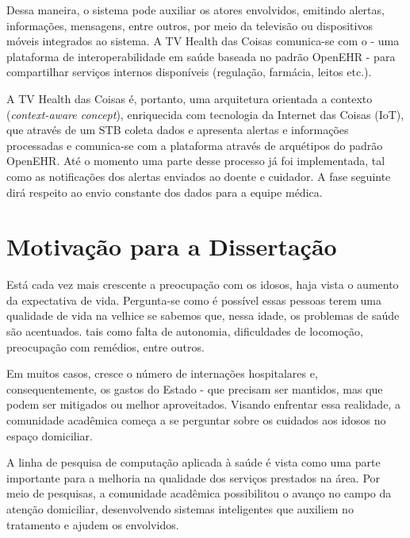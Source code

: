 Dessa maneira, o sistema pode auxiliar os atores envolvidos, emitindo alertas,
informações, mensagens, entre outros, por meio da televisão ou dispositivos móveis
integrados ao sistema. A TV Health das Coisas comunica-se com o \nextsaude[] - uma
plataforma de interoperabilidade em saúde baseada no padrão OpenEHR - para
compartilhar serviços internos disponíveis (regulação, farmácia, leitos etc.).

A TV Health das Coisas é, portanto, uma arquitetura orientada a contexto
(\textit{context-aware concept}), enriquecida com tecnologia da Internet das
Coisas (IoT), que através de um STB coleta dados e apresenta alertas e
informações processadas e comunica-se com a plataforma \nextsaude[] através de
arquétipos do padrão OpenEHR.  Até o momento uma parte desse processo já foi
implementada, tal como as notificações dos alertas enviados ao doente e
cuidador. A fase seguinte dirá respeito ao envio constante dos dados para a
equipe médica.


\section{Motivação para a Dissertação}\label{sec:motivacao}

Está cada vez mais crescente a preocupação com os idosos, haja vista o aumento
da expectativa de vida. Pergunta-se como é possível essas pessoas terem uma
qualidade de vida na velhice se sabemos que, nessa idade, os problemas de saúde
são acentuados.  tais como falta de autonomia, dificuldades de locomoção,
preocupação com remédios, entre outros.

Em muitos casos, cresce o número de internações hospitalares e,
consequentemente, os gastos do Estado - que precisam ser mantidos, mas que
podem ser mitigados ou melhor aproveitados.  Visando enfrentar essa realidade,
a comunidade acadêmica começa a se perguntar sobre os cuidados aos idosos no
espaço domiciliar.

A linha de pesquisa de computação aplicada à saúde é vista como uma parte
importante para a melhoria na qualidade dos serviços prestados na área. Por meio
de pesquisas, a comunidade acadêmica possibilitou o avanço no campo da atenção
domiciliar, desenvolvendo sistemas inteligentes que auxiliem no tratamento e
ajudem os envolvidos.

